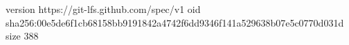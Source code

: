 version https://git-lfs.github.com/spec/v1
oid sha256:00e5de6f1cb68158bb9191842a4742f6dd9346f141a529638b07e5c0770d031d
size 388
